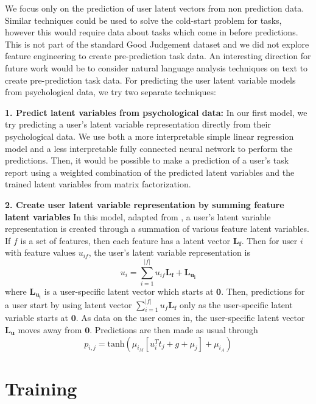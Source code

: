 \documentclass{article}
\begin{document}
We focus only on the prediction of user latent vectors from non prediction data. Similar techniques could be used to solve the cold-start problem for tasks, however this would require data about tasks which come in before predictions. This is not part of the standard Good Judgement dataset and we did not explore feature engineering to create pre-prediction task data. An interesting direction for future work would be to consider natural language analysis techniques on text to create pre-prediction task data. For predicting the user latent variable models from psychological data, we try two separate techniques: 

\noindent\textbf{1. Predict latent variables from psychological data: } In our first model, we try predicting a user's latent variable representation directly from their psychological data. We use both a more interpretable simple linear regression model and a less interpretable fully connected neural network to perform the predictions. Then, it would be possible to make a prediction of a user's task report using a weighted combination of the predicted latent variables and the trained latent variables from matrix factorization. 

\noindent\textbf{2. Create user latent variable representation by summing feature latent variables} In this model, adapted from \citep{kula2015metadata}, a user's latent variable representation is created through a summation of various feature latent variables. If $f$ is a set of features, then each feature has a latent vector $\mathbf{L_{f}}$. Then for user $i$ with feature values $u_{if}$, the user's latent variable representation is $$u_{i} = \sum_{i=1}^{\vert f \vert} u_{if} \mathbf{L_{f}} + \mathbf{L_{u_{i}}}$$ where $\mathbf{L_{u_{i}}}$ is a user-specific latent vector which starts at $\mathbf{0}$. Then, predictions for a user start by using latent vector $\sum_{i=1}^{\vert f \vert} u_{f} \mathbf{L_{f}}$ only as the user-specific latent variable starts at $\mathbf{0}$. As data on the user comes in, the user-specific latent vector $\mathbf{L_{u}}$ moves away from $\mathbf{0}$. Predictions are then made as usual through  $$
  p_{i,j} = \textrm{tanh}\left( \mu_{i_M}\left[u_i^{T}t_j + g + \mu_j\right] + \mu_{i_A}\right)
 $$

\section{Training}\label{sec:training}

%
%
\end{document}
